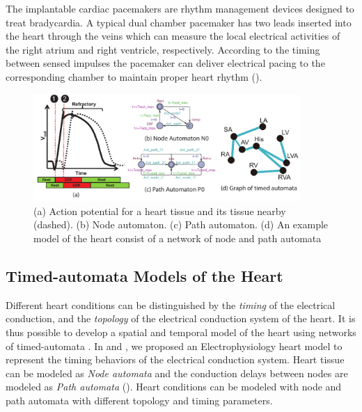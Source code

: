 The implantable cardiac pacemakers are rhythm management devices designed to treat bradycardia. A typical dual chamber pacemaker has two leads inserted into the heart through the veins which can measure the local electrical activities of the right atrium and right ventricle, respectively. According to the timing between sensed impulses the pacemaker can deliver electrical pacing to the corresponding chamber to maintain proper heart rhythm ().  
\begin{figure}[!t]
	\centering
	\includegraphics[width=0.9\textwidth]{figs/init_abs.pdf}
	\caption{\small (a) Action potential for a heart tissue and its tissue nearby (dashed). (b) Node automaton. (c) Path automaton. (d) An example model of the heart consist of a network of node and path automata}
	\label{fig:nodepathTA}
\end{figure}

\subsection{Timed-automata Models of the Heart}
\label{labeledGraph}
Different heart conditions can be distinguished by the \emph{timing} of the electrical conduction, and the \emph{topology} of the electrical conduction system of the heart. It is thus possible to develop a spatial and temporal model of the heart using networks of timed-automata \cite{timed_automata}. In \cite{VHM_proc} and \cite{sttt13}, we proposed an Electrophysiology heart model to represent the timing behaviors of the electrical conduction system. Heart tissue can be modeled as \emph{Node automata} and the conduction delays between nodes are modeled as \emph{Path automata} (). Heart conditions can be modeled with node and path automata with different topology and timing parameters.

